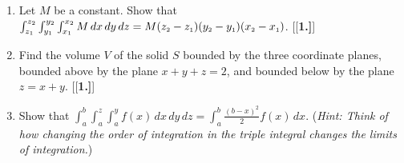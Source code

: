 \begin{enumerate}[\bfseries 1.]
 \item Let $M$ be a constant. Show that $\int_{z_{\scriptscriptstyle 1}}^{z_{\scriptscriptstyle 2}} \int_{y_{\scriptscriptstyle 1}}^{y_{\scriptscriptstyle 2}}
  \int_{x_{\scriptscriptstyle 1}}^{x_{\scriptscriptstyle 2}} M\,dx\,dy\,dz = M(z_{\scriptscriptstyle 2} - z_{\scriptscriptstyle 1})(y_{\scriptscriptstyle 2} - y_{\scriptscriptstyle 1})
  (x_{\scriptscriptstyle 2} - x_{\scriptscriptstyle 1})$.
[{[\bfseries 1.]}]
 \item Find the volume $V$ of the solid $S$ bounded by the three coordinate planes, bounded above by the plane
  $x+y+z=2$, and bounded below by the plane $z=x+y$.
[{[\bfseries 1.]}]
 \item Show that $\displaystyle\int_a^b \displaystyle\int_a^z \displaystyle\int_a^y f(x)\,dx\,dy\,dz =
  \displaystyle\int_a^b \tfrac{(b-x)^2 }{2} f(x)\,dx$. (\emph{Hint: Think of how changing the order of integration in
  the triple integral changes the limits of integration.})
\end{enumerate}
\newpage
